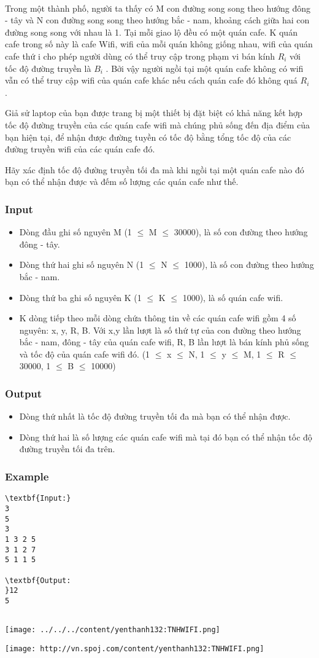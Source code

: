 

 

Trong một thành phố, người ta thấy có M con đường song song theo hướng đông - tây và N con đường song song theo hướng bắc - nam, khoảng cách giữa hai con đường song song với nhau là 1. Tại mỗi giao lộ đều có một quán cafe. K quán cafe trong số này là cafe Wifi, wifi của mỗi quán không giống nhau, wifi của quán cafe thứ i cho phép người dùng có thể truy cập trong phạm vi bán kính $R_{i}$ với tốc độ đường truyền là $B_{i}$ . Bởi vậy người ngồi tại một quán cafe không có wifi vẫn có thể truy cập wifi của quán cafe khác nếu cách quán cafe đó không quá $R_{i}$ .

Giả sử laptop của bạn được trang bị một thiết bị đặt biệt có khả năng kết hợp tốc độ đường truyền của các quán cafe wifi mà chúng phủ sống đến địa điểm của bạn hiện tại, để nhận được đường tuyền có tốc độ bằng tổng tốc độ của các đường truyền wifi của các quán cafe đó.

Hãy xác định tốc độ đường truyền tối đa mà khi ngồi tại một quán cafe nào đó bạn có thể nhận được và đếm số lượng các quán cafe như thế.

\subsubsection{Input}
\begin{itemize}
	\item Dòng đầu ghi số nguyên M (1 $\le$ M $\le$ 30000), là số con đường theo hướng đông - tây.
	\item Dòng thứ hai ghi số nguyên N (1 $\le$ N $\le$ 1000), là số con đường theo hướng bắc - nam.
	\item Dòng thứ ba ghi số nguyên K (1 $\le$ K $\le$ 1000), là số quán cafe wifi.
	\item K dòng tiếp theo mỗi dòng chứa thông tin về các quán cafe wifi gồm 4 số nguyên: x, y, R, B. Với x,y lần lượt là số thứ tự của con đường theo hướng bắc - nam, đông - tây của quán cafe wifi, R, B lần lượt là bán kính phủ sống và tốc độ của quán cafe wifi đó. (1 $\le$ x $\le$ N, 1 $\le$ y $\le$ M, 1 $\le$ R $\le$ 30000, 1 $\le$ B $\le$ 10000)
\end{itemize}

\subsubsection{Output}
\begin{itemize}
	\item Dòng thứ nhất là tốc độ đường truyền tối đa mà bạn có thể nhận được.
	\item Dòng thứ hai là số lượng các quán cafe wifi mà tại đó bạn có thể nhận tốc độ đường truyền tối đa trên.
\end{itemize}

\subsubsection{Example}
\begin{verbatim}
\textbf{Input:}
3
5
3
1 3 2 5
3 1 2 7
5 1 1 5

\textbf{Output:
}12
5


\end{verbatim}


\texttt{[image: ../../../content/yenthanh132:TNHWIFI.png]}


\texttt{[image: http://vn.spoj.com/content/yenthanh132:TNHWIFI.png]}
